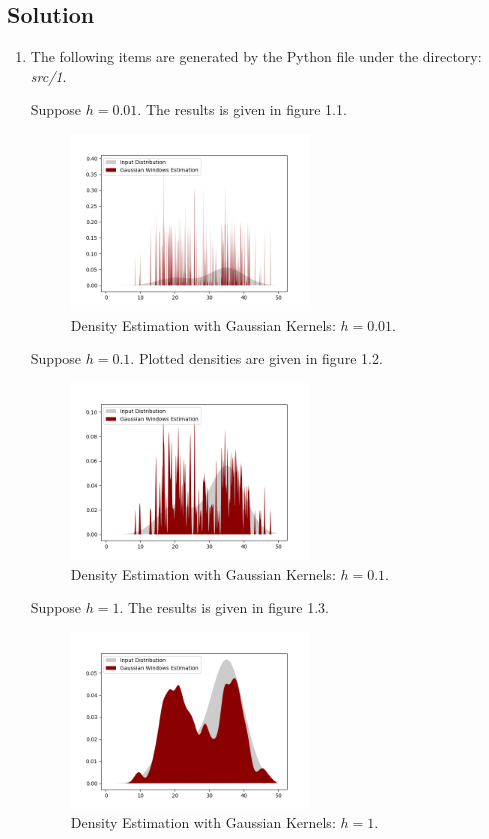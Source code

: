 \documentclass[12pt]{article}
\numberwithin{equation}{section}
\numberwithin{table}{section}
\numberwithin{figure}{section}
\begin{document}
\subsection*{Solution}
\begin{enumerate}[label=(\alph*)]
	\item The following items are generated by the Python file under the directory: \textit{src/1}.
	
	Suppose $h = 0.01$. The results is given in figure 1.1.
		\begin{figure}[!h]\centering
		\includegraphics[width=0.6\textwidth]{1_a_1.PNG}
		\caption{Density Estimation with Gaussian Kernels: $h = 0.01$.}
		\label{pl1}
	\end{figure}

	Suppose $h = 0.1$. Plotted densities are given in figure 1.2.
			\begin{figure}[!h]\centering
		\includegraphics[width=0.6\textwidth]{1_a_2.PNG}
		\caption{Density Estimation with Gaussian Kernels: $h = 0.1$.}
		\label{pl1}
	\end{figure}
	
	Suppose $h = 1$. The results is given in figure 1.3.
	\begin{figure}[!h]\centering
		\includegraphics[width=0.6\textwidth]{1_a_3.PNG}
		\caption{Density Estimation with Gaussian Kernels: $h = 1$.}
		\label{pl1}
	\end{figure}


\end{enumerate}
\end{document}
